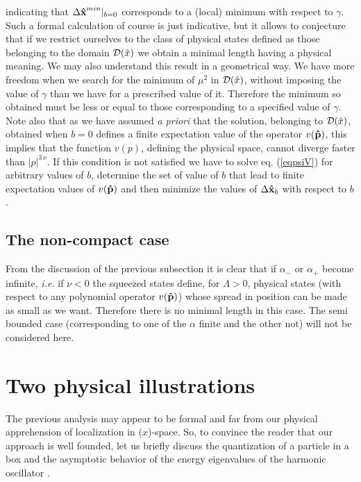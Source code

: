 \documentclass[a4paper,10pt]{article}
\newcommand{\x}{\mbox{\rm{\bf \^ x}}}
\newcommand{\p}{\mbox{\rm{\bf \^ p}}}
\newcommand{\cD}{{\cal D}}
\begin{document}
indicating that $\Delta\x^{min}|_{b=0}$ corresponds to a (local)
minimum with respect to $\gamma$. Such a formal calculation of
course is just indicative, but it allows to conjecture that if we
restrict ourselves to the class of physical states defined as
those belonging to the domain $\cD(\hat x)$ we obtain a minimal
length having a physical meaning. We may also understand this
result in a geometrical way. We have more freedom when we search
for the minimum of $\mu^2$ in $\cD(\hat x)$, without imposing the
value of $\gamma$ than we have for a prescribed value of it.
Therefore the minimum so obtained must be less or equal to those
corresponding to a specified value of $\gamma$. Note also that as
we have assumed {\it a priori} that the solution, belonging to
$\cD(\hat x)$, obtained when $b=0$ defines a finite expectation
value of the operator $v(\p)$, this implies that the function
$v(p)$, defining the physical space, cannot diverge faster than
$|p|^{3\,\nu}$. If this condition is not satisfied we have to
solve eq. (\ref{eqpsiV}) for arbitrary values of $b$, determine
the set of value of $b$ that lead to finite expectation values of
$v(\p)$ and then minimize the values of $\Delta\x_b$ with respect
to $b$.
\subsection{The non-compact case}
From the discussion of the previous subsection it is clear that if
$\alpha_-$ or $\alpha_+$ become infinite, {\it i.e.} if $\nu<0$
the squeezed states define, for $\Lambda>0$, physical states (with
respect to any polynomial operator $v(\p)$) whose spread in
position can be made as small as we want. Therefore there is no
minimal length in this case. The semi bounded case (corresponding
to one of the $\alpha$ finite and the other not) will not be
considered here.
\section{Two physical illustrations}
The previous analysis may appear to be formal and far from our
physical apprehension of localization in ($x$)-space. So, to
convince the reader that our approach is well founded, let us
briefly discuss the quantization of a particle in a box
\cite{BGLS} and the asymptotic behavior of the energy eigenvalues
of the harmonic oscillator \cite{K2}.
\end{document}
